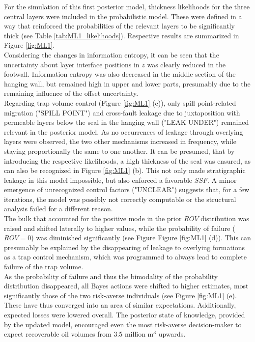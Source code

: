 		For the simulation of this first posterior model, thickness likelihoods for the three central layers were included in the probabilistic model. These were defined in a way that reinforced the probabilities of the relevant layers to be significantly thick (see Table \ref{tab:ML1_likelihoods}). Respective results are summarized in Figure \ref{fig:ML1}.\\
		Considering the changes in information entropy, it can be seen that the uncertainty about layer interface positions in $z$ was clearly reduced in the footwall. Information entropy was also decreased in the middle section of the hanging wall, but remained high in upper and lower parts, presumably due to the remaining influence of the offset uncertainty.\\
		Regarding trap volume control (Figure \ref{fig:ML1} (c)), only spill point-related migration ("SPILL POINT") and cross-fault leakage due to juxtaposition with permeable layers below the seal in the hanging wall ("LEAK UNDER") remained relevant in the posterior model. As no occurrences of leakage through overlying layers were observed, the two other mechanisms increased in frequency, while staying proportionally the same to one another. It can be presumed, that by introducing the respective likelihoods, a high thickness of the seal was ensured, as can also be recognized in Figure \ref{fig:ML1} (b). This not only made stratigraphic leakage in this model impossible, but also enforced a favorable $SSF$. A minor emergence of unrecognized control factors ("UNCLEAR") suggests that, for a few iterations, the model was possibly not correctly computable or the structural analysis failed for a different reason.\\
		The bulk that accounted for the positive mode in the prior $ROV$ distribution was raised and shifted laterally to higher values, while the probability of failure ($ROV = 0$) was diminished significantly (see Figure Figure \ref{fig:ML1} (d)). This can presumably be explained by the disappearing of leakage to overlying formations as a trap control mechanism, which was programmed to always lead to complete failure of the trap volume.\\
		As the probability of failure and thus the bimodality of the probability distribution disappeared, all Bayes actions were shifted to higher estimates, most significantly those of the two risk-averse individuals (see Figure \ref{fig:ML1} (e). These have thus converged into an area of similar expectations. Additionally, expected losses were lowered overall. The posterior state of knowledge, provided by the updated model, encouraged even the most risk-averse decision-maker to expect recoverable oil volumes from 3.5 million m$^3$ upwards.
		
